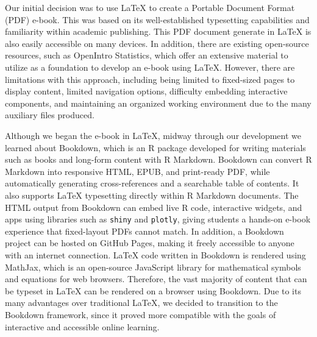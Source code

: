 \documentclass[11pt]{article}
\begin{document}
Our initial decision was to use LaTeX to create a Portable Document Format (PDF) e-book.
This was based on its well-established typesetting capabilities and familiarity within academic publishing.
This PDF document generate in LaTeX is also easily accessible on many devices.
In addition, there are existing open-source resources, such as OpenIntro Statistics, which offer an extensive material to utilize as a foundation to develop an e-book using LaTeX.
However, there are limitations with this approach, including being limited to fixed-sized pages to display content, limited navigation options, difficulty embedding interactive components, and maintaining an organized working environment due to the many auxiliary files produced.

Although we began the e-book in LaTeX, midway through our development we learned about Bookdown, which is an R package developed for writing materials such as books and long-form content with R Markdown. 
Bookdown can convert R Markdown into responsive HTML, EPUB, and print-ready PDF, while automatically generating cross-references and a searchable table of contents. It also supports LaTeX typesetting directly within R Markdown documents. The HTML output from Bookdown can embed live R code, interactive widgets, and apps using libraries such as \texttt{shiny} and \texttt{plotly}, giving students a hands-on e-book experience that fixed-layout PDFs cannot match. In addition, a Bookdown project can be hosted on GitHub Pages, making it freely accessible to anyone with an internet connection.
LaTeX code written in Bookdown is rendered using MathJax, which is an open-source JavaScript library for mathematical symbols and equations for web browsers.
Therefore, the vast majority of content that can be typeset in LaTeX can be rendered on a browser using Bookdown.
Due to its many advantages over traditional LaTeX, we decided to transition to the Bookdown framework, since it proved more compatible with the goals of interactive and accessible online learning. 
\end{document}

